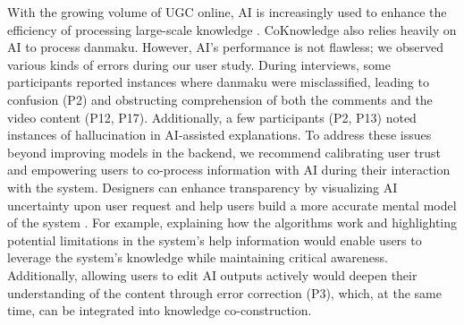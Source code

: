 With the growing volume of UGC online, AI is increasingly used to enhance the efficiency of processing large-scale knowledge \cite{liu2023coargue}. CoKnowledge also relies heavily on AI to process danmaku. However, AI's performance is not flawless; we observed various kinds of errors during our user study. During interviews, some participants reported instances where danmaku were misclassified, leading to confusion (P2) and obstructing comprehension of both the comments and the video content (P12, P17). Additionally, a few participants (P2, P13) noted instances of hallucination in AI-assisted explanations.
To address these issues beyond improving models in the backend, we recommend calibrating user trust and empowering users to co-process information with AI during their interaction with the system. Designers can enhance transparency by visualizing AI uncertainty upon user request \cite{bhatt2021uncertainty} 
and help users build a more accurate mental model of the system \cite{gero2020mental}. For example, explaining how the algorithms work \cite{schmidt2020transparency} and highlighting potential limitations \cite{cheng2019explaining} in the system's help information
would enable users to leverage the system's knowledge while maintaining critical awareness. Additionally, allowing users to edit AI outputs actively would deepen their understanding of the content through error correction (P3), which, at the same time, can be integrated into knowledge co-construction.


